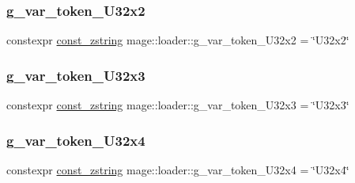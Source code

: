 \subsubsection{\texorpdfstring{g\+\_\+var\+\_\+token\+\_\+\+U32x2}{g\_var\_token\_U32x2}}
{\footnotesize\ttfamily constexpr \mbox{\hyperlink{namespacemage_abfd9206dc607ceb5d13ec68bf075a5c0}{const\+\_\+zstring}} mage\+::loader\+::g\+\_\+var\+\_\+token\+\_\+\+U32x2 = \char`\"{}U32x2\char`\"{}}

\mbox{\label{namespacemage_1_1loader_acc60bccde83541a750b81771ec74276e}} 
\subsubsection{\texorpdfstring{g\+\_\+var\+\_\+token\+\_\+\+U32x3}{g\_var\_token\_U32x3}}
{\footnotesize\ttfamily constexpr \mbox{\hyperlink{namespacemage_abfd9206dc607ceb5d13ec68bf075a5c0}{const\+\_\+zstring}} mage\+::loader\+::g\+\_\+var\+\_\+token\+\_\+\+U32x3 = \char`\"{}U32x3\char`\"{}}

\mbox{\label{namespacemage_1_1loader_ae83a00a2c31d561dfc1772e8de001531}} 
\subsubsection{\texorpdfstring{g\+\_\+var\+\_\+token\+\_\+\+U32x4}{g\_var\_token\_U32x4}}
{\footnotesize\ttfamily constexpr \mbox{\hyperlink{namespacemage_abfd9206dc607ceb5d13ec68bf075a5c0}{const\+\_\+zstring}} mage\+::loader\+::g\+\_\+var\+\_\+token\+\_\+\+U32x4 = \char`\"{}U32x4\char`\"{}}

